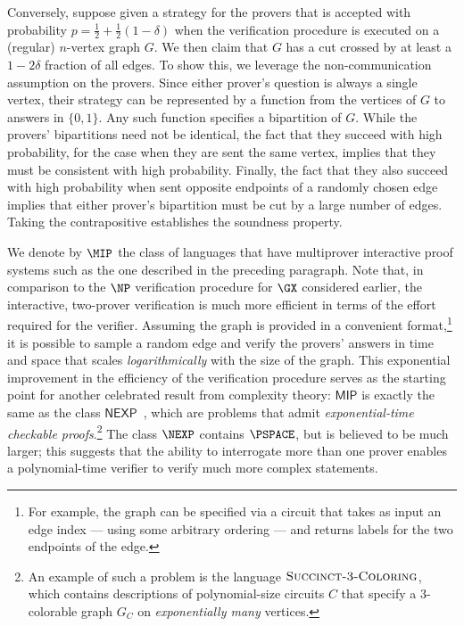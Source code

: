 Conversely, suppose given a strategy for the provers that is accepted with probability $p = \frac{1}{2} + \frac{1}{2}(1-\delta)$ when the verification procedure is executed on a (regular) $n$-vertex graph $G$. 
We then claim that $G$ has a cut crossed by at least a $1-2\delta$ fraction of all edges. To show this, we leverage the non-communication assumption on the provers. Since either prover's question is always a single vertex, their strategy can be represented by a function from the vertices of $G$ to answers in $\{0,1\}$. Any such function specifies a bipartition of $G$. While the provers'  bipartitions need not be identical, the fact that they succeed with high probability, for the case when they are sent the same vertex, implies that they must be consistent with high probability. Finally, the fact that they also succeed with high probability when sent opposite endpoints of a randomly chosen edge implies that either prover's bipartition must be cut by a large number of edges. Taking the contrapositive establishes the soundness property.

We denote by $\MIP$ the class of languages that have multiprover interactive proof systems such as the one described in the preceding paragraph. 
Note that, in comparison to the $\NP$ verification procedure for $\GX$ considered earlier, the interactive, two-prover verification is much more efficient in terms of the effort required for the verifier.
 Assuming the graph is provided in a convenient format,\footnote{For example, the graph can be specified via a circuit that takes as input an edge index --- using some arbitrary ordering --- and returns labels for the two endpoints of the edge.} it is possible to sample a random edge and verify the provers' answers in time and space that scales \emph{logarithmically} with the size of the graph. This exponential improvement in the efficiency of the verification procedure serves as the starting point for another celebrated result from complexity theory: $\mathsf{MIP}$ is exactly the same as the class $\mathsf{NEXP}$~\cite{babai1991non}, which are problems that admit \emph{exponential-time checkable proofs}.\footnote{An example of such a problem is the language $\textsc{Succinct-3-Coloring}$, which contains descriptions of polynomial-size circuits $C$ that specify a $3$-colorable graph $G_C$ on \emph{exponentially many} vertices.} The class $\NEXP$ contains $\PSPACE$, but is believed to be much larger; this suggests that the ability to interrogate more than one prover enables a polynomial-time verifier to verify much more complex statements.
 


